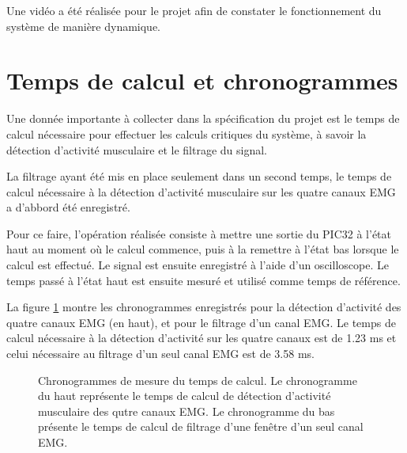 \documentclass[letterpaper, twoside, 12pt, memoire, creativecommons, hyperref]{thETS}
\begin{document}
Une vidéo a été réalisée pour le projet afin de constater le fonctionnement du système de manière dynamique.

\section{Temps de calcul et chronogrammes}

Une donnée importante à collecter dans la spécification du projet est le temps de calcul nécessaire pour effectuer les calculs critiques du système, à savoir la détection d'activité musculaire et le filtrage du signal.

La filtrage ayant été mis en place seulement dans un second temps, le temps de calcul nécessaire à la détection d'activité musculaire sur les quatre canaux EMG a d'abbord été enregistré. 

Pour ce faire, l'opération réalisée consiste à mettre une sortie du PIC32 à l'état haut au moment où le calcul commence, puis à la remettre à l'état bas lorsque le calcul est effectué. Le signal est ensuite enregistré à l'aide d'un oscilloscope. Le temps passé à l'état haut est ensuite mesuré et utilisé comme temps de référence. 

La figure \ref{fig:chronogrammes} montre les chronogrammes enregistrés pour la détection d'activité des quatre canaux EMG (en haut), et pour le filtrage d'un canal EMG. Le temps de calcul nécessaire à la détection d'activité sur les quatre canaux est de 1.23 ms et celui nécessaire au filtrage d'un seul canal EMG est de 3.58 ms.

\begin{figure}
	\centering
	\caption{Chronogrammes de mesure du temps de calcul. Le chronogramme du haut représente le temps de calcul de détection d'activité musculaire des qutre canaux EMG. Le chronogramme du bas présente le temps de calcul de filtrage d'une fenêtre d'un seul canal EMG.}
	\label{fig:chronogrammes}
\end{figure}
\end{document}
